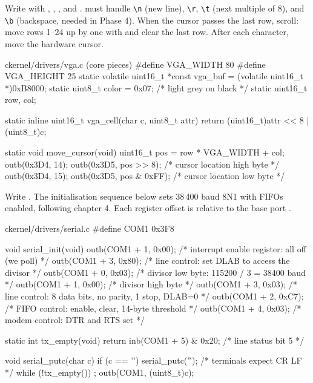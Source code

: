 \documentclass[11pt,a4paper]{article}
\begin{document}
Write  with , , ,
 and .  must handle \texttt{\textbackslash n} (new line), \texttt{\textbackslash r}, \texttt{\textbackslash t} (next
multiple of 8), and \texttt{\textbackslash b} (backspace, needed in Phase 4). When the cursor passes the last row, scroll: move rows
1--24 up by one with  and clear the last row. After each character, move the hardware cursor.

\begin{lst}{c}{kernel/drivers/vga.c (core pieces)}
#define VGA_WIDTH  80
#define VGA_HEIGHT 25
static volatile uint16_t *const vga_buf = (volatile uint16_t *)0xB8000;
static uint8_t  color = 0x07;             /* light grey on black */
static uint16_t row, col;

static inline uint16_t vga_cell(char c, uint8_t attr)
{
    return (uint16_t)attr << 8 | (uint8_t)c;
}

static void move_cursor(void)
{
    uint16_t pos = row * VGA_WIDTH + col;
    outb(0x3D4, 14); outb(0x3D5, pos >> 8);    /* cursor location high byte */
    outb(0x3D4, 15); outb(0x3D5, pos & 0xFF);  /* cursor location low byte  */
}
\end{lst}

Write . The initialisation sequence below sets 38\,400 baud 8N1 with FIFOs enabled,
following \LOB chapter 4. Each register offset is relative to the base port .

\begin{lst}{c}{kernel/drivers/serial.c}
#define COM1 0x3F8

void serial_init(void)
{
    outb(COM1 + 1, 0x00);   /* interrupt enable register: all off (we poll)        */
    outb(COM1 + 3, 0x80);   /* line control: set DLAB to access the divisor         */
    outb(COM1 + 0, 0x03);   /* divisor low byte:  115200 / 3 = 38400 baud           */
    outb(COM1 + 1, 0x00);   /* divisor high byte                                     */
    outb(COM1 + 3, 0x03);   /* line control: 8 data bits, no parity, 1 stop, DLAB=0 */
    outb(COM1 + 2, 0xC7);   /* FIFO control: enable, clear, 14-byte threshold       */
    outb(COM1 + 4, 0x03);   /* modem control: DTR and RTS set                        */
}

static int tx_empty(void) { return inb(COM1 + 5) & 0x20; }  /* line status bit 5 */

void serial_putc(char c)
{
    if (c == '\n')
        serial_putc('\r');  /* terminals expect CR LF */
    while (!tx_empty())
        ;
    outb(COM1, (uint8_t)c);
}
\end{lst}
\end{document}
